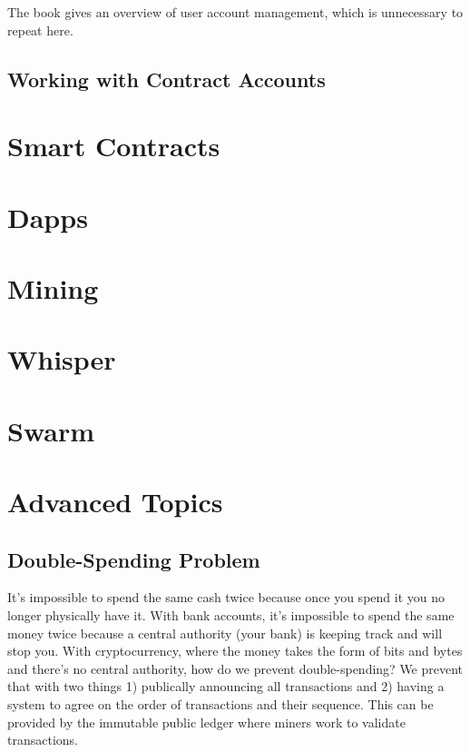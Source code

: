 \documentclass{article}
\begin{document}
The book gives an overview of user account management, which is unnecessary to repeat here.

\subsection{Working with Contract Accounts}

\section{Smart Contracts}

\section{Dapps}

\section{Mining}

\section{Whisper}

\section{Swarm}

\section{Advanced Topics}

\subsection{Double-Spending Problem}
It's impossible to spend the same cash twice because once you spend it you no longer physically have it. With bank accounts, it's impossible to spend the same money twice because a central authority (your bank) is keeping track and will stop you. With
cryptocurrency, where the money takes the form of bits and bytes and there's no central authority, how do we prevent double-spending? We prevent that with two things 1) publically announcing all transactions and 2) having a system to agree on the order
of transactions and their sequence. This can be provided by the immutable public ledger where miners work to validate transactions.
\end{document}
